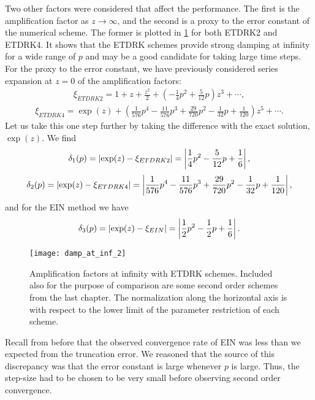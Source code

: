 Two other factors were considered that affect the performance. The first is the amplification factor as $z\to\infty$, and the second is a proxy to the error constant of the numerical scheme. The former is plotted in \cref{fig:damp fac at inf etd} for both ETDRK2 and ETDRK4. It shows that the ETDRK schemes provide strong damping at infinity for a wide range of $p$ and may be a good candidate for taking large time steps. For the proxy to the error constant, we have previously considered series expansion at $z=0$ of the amplification factors:
\begin{align}
        \xi_{ETDRK2} = 1+ z + \frac{z^2}{2} + \left(-\frac{1}{4}p^2 + \frac{5}{12}p \right) z^3 + \cdots ,
\end{align}
\begin{align}
        \xi_{ETDRK4} = \exp(z) + \left( 
\frac{1}{576}p^4 
- \frac{11}{576}p^3
+ \frac{29}{720}p^2
- \frac{1}{32}p
+ \frac{1}{120} 
\right) z^5 + \cdots .
\end{align}
Let us take this one step further by taking the difference with the exact solution, $\exp(z)$. We find 
\begin{align}
        \delta_1(p) = \left|\exp(z) - \xi_{ETDRK2}\right| 
= \left|\frac{1}{4}p^2 - \frac{5}{12}p + \frac{1}{6}\right|,
\end{align}
\begin{align}
        \delta_2(p) = \left|\exp(z) - \xi_{ETDRK4}\right| 
= \left|\frac{1}{576}p^4 
- \frac{11}{576}p^3
+ \frac{29}{720}p^2
- \frac{1}{32}p
+ \frac{1}{120} \right|,
\end{align}
and for the EIN method we have 
\begin{align}
\delta_3(p) = \left|\exp(z) - \xi_{EIN}\right| 
= \left|\frac{1}{2} p^2 - \frac{1}{2}p + \frac{1}{6}\right|.
\end{align}

\begin{figure}[htb!]
        \centering
\texttt{[image: damp\_at\_inf\_2]}
\caption[Amplification factors at infinity with ETDRK schemes.]{Amplification factors at infinity with ETDRK schemes. Included also for the purpose of comparison are some second order schemes from the last chapter. The normalization along the horizontal axis is with respect to the lower limit of the parameter restriction of each scheme.}
\label{fig:damp fac at inf etd}
\end{figure}

Recall from before that the observed convergence rate of EIN was less than we expected from the truncation error. We reasoned that the source of this discrepancy was that the error constant is large whenever $p$ is large. Thus, the step-size had to be chosen to be very small before observing second order convergence.

